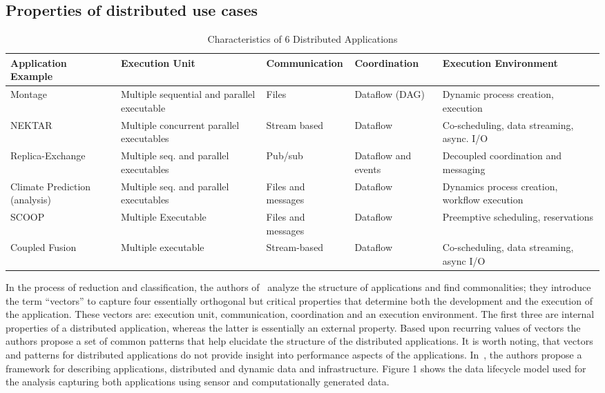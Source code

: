 \documentclass{acm_proc_article-sp}
\begin{document}
\subsection{Properties of distributed use cases}
\begin{table}
\centering
\caption{Characteristics of 6 Distributed Applications}
\label{Table4}
\begin{tabular}{|p{2cm}|p{2cm}|p{3cm}|p{2cm}|p{3cm}|} \hline
\textbf{Application Example} & \textbf{Execution Unit} & \textbf{Communication} & \textbf{Coordination} & \textbf{Execution Environment} \\ \hline
Montage & Multiple sequential and parallel executable & Files & Dataflow (DAG) & Dynamic process creation, execution \\ \hline
NEKTAR  & Multiple concurrent parallel executables & Stream based & Dataflow & Co-scheduling, data streaming, async. I/O \\ \hline
Replica-Exchange & Multiple seq. and parallel executables & Pub/sub & Dataflow and events & Decoupled coordination and messaging \\ \hline
Climate Prediction (analysis)& Multiple seq. and parallel executables & Files and messages & Dataflow & Dynamics process creation, workflow execution \\ \hline
SCOOP & Multiple Executable & Files and messages & Dataflow & Preemptive scheduling, reservations \\ \hline
Coupled Fusion & Multiple executable & Stream-based & Dataflow & Co-scheduling, data streaming, async I/O
\\ \hline
\end{tabular}
\end{table} 

In the process of reduction and classification, the authors of~\cite{b28,b26}
analyze the structure of applications and find commonalities; they introduce
the term ``vectors'' to capture four essentially orthogonal but critical
properties that determine both the development and the execution of the
application. These vectors are: execution unit, communication, coordination and
an execution environment. The first three are internal properties of a
distributed application, whereas the latter is essentially an external
property. Based upon recurring values of vectors the authors propose a set of
common patterns that help elucidate the structure of the distributed
applications. It is worth noting, that vectors and patterns for distributed
applications do not provide insight into performance aspects of the
applications. In~\cite{b28}, the authors propose a framework for describing
applications, distributed and dynamic data and infrastructure. Figure 1 shows
the data lifecycle model used for the analysis capturing both applications
using sensor and computationally generated data.
\end{document}
